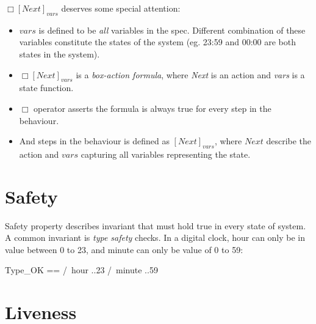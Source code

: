 \documentclass{report}
\begin{document}
$\Box[Next]_{vars}$ deserves some special attention:
\begin{itemize}
    \item $vars$ is defined to be \textit{all} variables in the spec. Different
    combination of these variables constitute the states of the system (eg.
    23:59 and 00:00 are both states in the system).
    \item $\Box[Next]_{vars}$ is a \textit{box-action formula}, where
    \textit{Next} is an action and \textit{vars} is a state function.
    \item $\Box$ operator asserts the formula is always true for every step in the behaviour.
    \item And steps in the behaviour is defined as $[Next]_{vars}$, where $Next$
    describe the action and $vars$ capturing all variables representing the state.
\end{itemize}


\section{Safety}

Safety property describes invariant that must hold true in every state of
system. A common invariant is \textit{type safety} checks. In a digital clock, 
hour can only be in value between 0 to 23, and minute can only be value of 0 to 59:\newline

\begin{tla}
    Type_OK == 
        /\ hour ..23
        /\ minute ..59
\end{tla}
\begin{tlatex}
%
%
%
\end{tlatex}

\section{Liveness}
\end{document}
